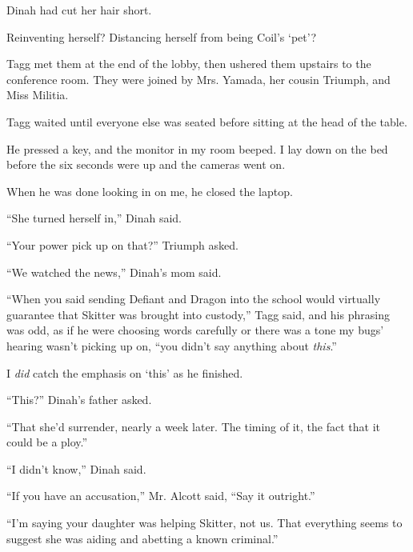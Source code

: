Dinah had cut her hair short.



Reinventing herself?  Distancing herself from being Coil's `pet'?



Tagg met them at the end of the lobby, then ushered them upstairs to the conference room.  They were joined by Mrs. Yamada, her cousin Triumph, and Miss Militia.



Tagg waited until everyone else was seated before sitting at the head of the table.



He pressed a key, and the monitor in my room beeped.  I lay down on the bed before the six seconds were up and the cameras went on.



When he was done looking in on me, he closed the laptop.



``She turned herself in,'' Dinah said.



``Your power pick up on that?''  Triumph asked.



``We watched the news,'' Dinah's mom said.



``When you said sending Defiant and Dragon into the school would virtually guarantee that Skitter was brought into custody,'' Tagg said, and his phrasing was odd, as if he were choosing words carefully or there was a tone my bugs' hearing wasn't picking up on, ``you didn't say anything about \emph{this}.''



I \emph{did} catch the emphasis on `this' as he finished.



``This?'' Dinah's father asked.



``That she'd surrender, nearly a week later.  The timing of it, the fact that it could be a ploy.''



``I didn't know,'' Dinah said.



``If you have an accusation,'' Mr. Alcott said, ``Say it outright.''



``I'm saying your daughter was helping Skitter, not us.  That everything seems to suggest she was aiding and abetting a known criminal.''




